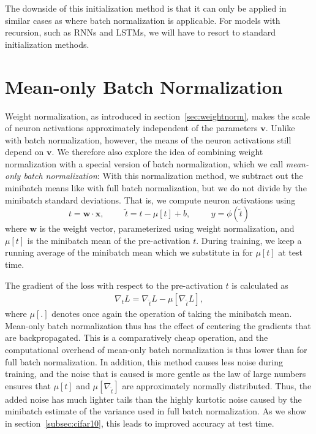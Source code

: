 \documentclass{article}
\newcommand{\bx}{\mathbf{x}}
\newcommand{\bv}{\mathbf{v}}
\newcommand{\bw}{\mathbf{w}}
\begin{document}
The downside of this initialization method is that it can only be applied in similar cases as where batch normalization is applicable. For models with recursion, such as RNNs and LSTMs, we will have to resort to standard initialization methods.

\section{Mean-only Batch Normalization}
\label{sec:meanonly}
Weight normalization, as introduced in section~\ref{sec:weightnorm}, makes the scale of neuron activations approximately independent of the parameters $\bv$. Unlike with batch normalization, however, the means of the neuron activations still depend on $\bv$. We therefore also explore the idea of combining weight normalization with a special version of batch normalization, which we call \emph{mean-only batch normalization}: With this normalization method, we subtract out the minibatch means like with full batch normalization, but we do not divide by the minibatch standard deviations. That is, we compute neuron activations using
\begin{equation}
t = \bw\cdot\bx, \hspace{1cm} \tilde{t} = t - \mu[t] + b, \hspace{1cm} y = \phi(\tilde{t})
\end{equation}
where $\bw$ is the weight vector, parameterized using weight normalization, and $\mu[t]$ is the minibatch mean of the pre-activation $t$. During training, we keep a running average of the minibatch mean which we substitute in for $\mu[t]$ at test time.

The gradient of the loss with respect to the pre-activation $t$ is calculated as
\begin{align}
\nabla_{t}L = \nabla_{\tilde{t}}L - \mu[\nabla_{\tilde{t}}L],
\end{align}
where $\mu[.]$ denotes once again the operation of taking the minibatch mean. Mean-only batch normalization thus has the effect of centering the gradients that are backpropagated. This is a comparatively cheap operation, and the computational overhead of mean-only batch normalization is thus lower than for full batch normalization. In addition, this method causes less noise during training, and the noise that is caused is more gentle as the law of large numbers ensures that $\mu[t]$ and $\mu[\nabla_{\tilde{t}}]$ are approximately normally distributed. Thus, the added noise has much lighter tails than the highly kurtotic noise caused by the minibatch estimate of the variance used in full batch normalization. As we show in section~\ref{subsec:cifar10}, this leads to improved accuracy at test time.
\end{document}

